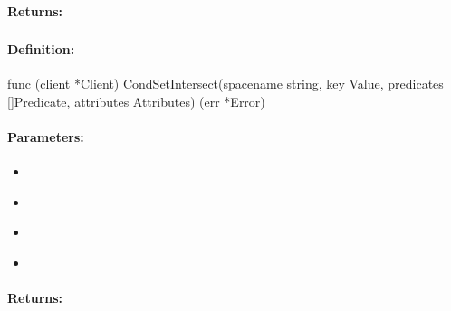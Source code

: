 \paragraph{Returns:}


\pagebreak
\subsubsection{}
\label{api:Go:CondSetIntersect}


\paragraph{Definition:}
\begin{gocode}
func (client *Client) CondSetIntersect(spacename string, key Value, predicates []Predicate, attributes Attributes) (err *Error)
\end{gocode}

\paragraph{Parameters:}
\begin{itemize}[noitemsep]
\item {}\\

\item {}\\

\item {}\\

\item {}\\

\end{itemize}

\paragraph{Returns:}


\pagebreak
\subsubsection{}
\label{api:Go:SetUnion}


